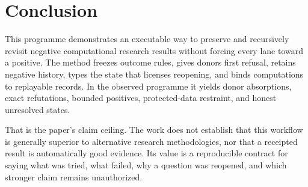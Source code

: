 \section{Conclusion}

This programme demonstrates an executable way to preserve and recursively revisit negative computational research results without forcing every lane toward a positive. The method freezes outcome rules, gives donors first refusal, retains negative history, types the state that licenses reopening, and binds computations to replayable records. In the observed programme it yields donor absorptions, exact refutations, bounded positives, protected-data restraint, and honest unresolved states.

That is the paper's claim ceiling. The work does not establish that this workflow is generally superior to alternative research methodologies, nor that a receipted result is automatically good evidence. Its value is a reproducible contract for saying what was tried, what failed, why a question was reopened, and which stronger claim remains unauthorized.